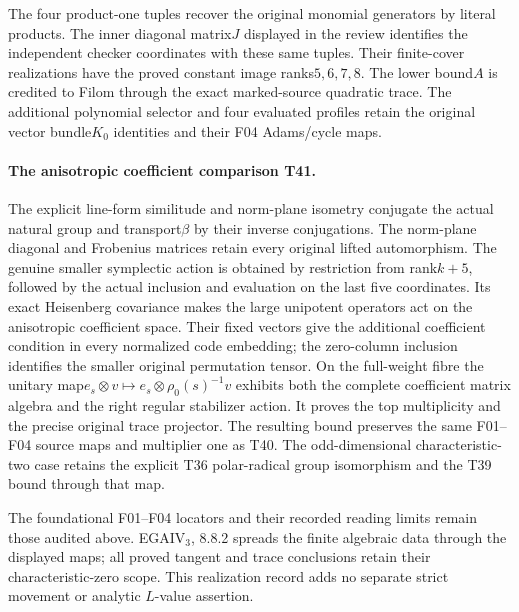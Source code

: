 The four product-one tuples recover the original
monomial generators by literal products. The inner
diagonal matrix$J$ displayed in the review identifies
the independent checker coordinates with these same
tuples. Their finite-cover realizations have the proved
constant image ranks$5,6,7,8$. The lower bound$A$
is credited to Filom through the exact marked-source
quadratic trace. The additional polynomial selector
and four evaluated profiles retain the original vector
bundle$K_0$ identities and their F04 Adams/cycle maps.


\paragraph{The anisotropic coefficient comparison T41.}
The explicit line-form similitude and norm-plane
isometry conjugate the actual natural group and
transport$\beta$ by their inverse conjugations.
The norm-plane diagonal and Frobenius matrices retain
every original lifted automorphism. The genuine
smaller symplectic action is obtained by restriction
from rank$k+5$, followed by the actual inclusion and
evaluation on the last five coordinates. Its exact
Heisenberg covariance makes the large unipotent
operators act on the anisotropic coefficient space.
Their fixed vectors give the additional coefficient
condition in every normalized code embedding; the
zero-column inclusion identifies the smaller original
permutation tensor. On the full-weight fibre the
unitary map$e_s\otimes v\mapsto e_s\otimes\rho_0(s)^{-1}v$
exhibits both the complete coefficient matrix algebra
and the right regular stabilizer action. It proves
the top multiplicity and the precise original trace
projector. The resulting bound preserves the same
F01--F04 source maps and multiplier one as T40.
The odd-dimensional characteristic-two case retains
the explicit T36 polar-radical group isomorphism
and the T39 bound through that map.


The foundational F01--F04 locators and their recorded
reading limits remain those audited above. EGAIV$_3$,
8.8.2 spreads the finite algebraic data through the
displayed maps; all proved tangent and trace conclusions
retain their characteristic-zero scope. This realization
record adds no separate strict movement or analytic
$L$-value assertion.
